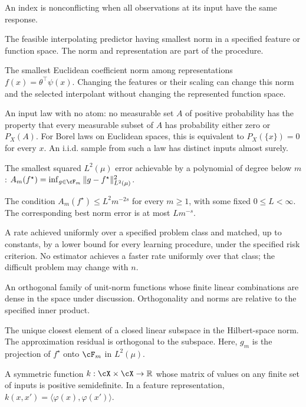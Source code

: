 \documentclass[11pt,twoside]{article}
\newcommand{\R}{\mathbb R}
\theoremstyle{definition}
\theoremstyle{remark}
\begin{document}
\begin{description}[style=nextline,leftmargin=1.5em,labelindent=0pt]
An index is nonconflicting when all observations at its input have the
same response.
\item[Minimum-norm interpolant]
The feasible interpolating predictor having smallest norm in a specified
feature or function space. The norm and representation are part of the
procedure.
\item[Feature-induced function norm $\|f\|_\psi$]
The smallest Euclidean coefficient norm among representations
$f(x)=\theta^\top\psi(x)$. Changing the features or their scaling can
change this norm and the selected interpolant without changing the
represented function space.
\item[Non-atomic input law]
An input law with no atom: no measurable set $A$ of positive probability has
the property that every measurable subset of $A$ has probability either zero
or $P_X(A)$. For Borel laws on Euclidean spaces, this is equivalent to
$P_X(\{x\})=0$ for every $x$. An i.i.d. sample from such a law has distinct
inputs almost surely.
\item[Approximation error $A_m(f^\star)$]
The smallest squared $L^2(\mu)$ error achievable by a polynomial of degree
below $m$: $A_m(f^\star)=\inf_{g\in\cF_m}\|g-f^\star\|_{L^2(\mu)}^2$.
\item[Polynomial approximation order $s$]
The condition $A_m(f^\star)\le L^2m^{-2s}$ for every $m\ge1$, with
some fixed $0\le L<\infty$. The corresponding best norm error is at most
$Lm^{-s}$.
\item[Minimax-optimal rate]
A rate achieved uniformly over a specified problem class and matched,
up to constants, by a lower bound for every learning procedure, under
the specified risk criterion. No estimator achieves a faster rate
uniformly over that class; the difficult problem may change with $n$.
\item[Orthonormal basis]
An orthogonal family of unit-norm functions whose finite linear
combinations are dense in the space under discussion. Orthogonality and
norms are relative to the specified inner product.
\item[Orthogonal projection]
The unique closest element of a closed linear subspace in the Hilbert-space
norm. The approximation residual is orthogonal to the subspace. Here,
$g_m$ is the projection of $f^\star$ onto $\cF_m$ in $L^2(\mu)$.
\item[Positive semidefinite kernel]
A symmetric function $k:\cX\times\cX\to\R$ whose matrix of values on
any finite set of inputs is positive semidefinite. In a feature
representation, $k(x,x')=\langle\varphi(x),\varphi(x')\rangle$.

\end{description}
\end{document}
